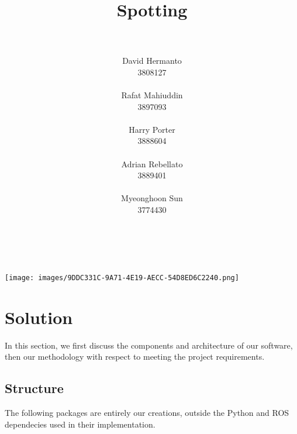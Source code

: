 \documentclass[10pt,english]{article}
\title{\huge{\textbf{Spotting}}}
\author{
    \\\\
    David Hermanto\\
    \small 3808127\\
    \\
    Rafat Mahiuddin\\
    \small 3897093\\
    \\
    Harry Porter\\
    \small 3888604\\
    \\
    Adrian Rebellato\\
    \small 3889401\\
    \\
    Myeonghoon Sun\\
    \small 3774430\\
    \\\\
}
\date{}
\begin{document}
\maketitle
\thispagestyle{empty}
\clearpage

\vspace*{\fill}
\begin{center}
\texttt{[image: images/9DDC331C-9A71-4E19-AECC-54D8ED6C2240.png]}
\end{center}
\vfill
\thispagestyle{empty}

\clearpage


\section*{Solution}

In this section, we first discuss the components and architecture of our software, then our methodology with respect to meeting the project requirements.


\subsection*{Structure}


The following packages are entirely our creations, outside the Python and ROS dependecies used in their implementation.

\end{document}
